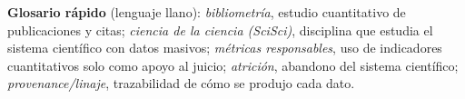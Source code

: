 \begin{tcolorbox}[nota]
\textbf{Glosario rápido} (lenguaje llano): \emph{bibliometría}, estudio
cuantitativo de publicaciones y citas; \emph{ciencia de la ciencia (SciSci)},
disciplina que estudia el sistema científico con datos masivos; \emph{métricas
responsables}, uso de indicadores cuantitativos solo como apoyo al juicio;
\emph{atrición}, abandono del sistema científico; \emph{provenance/linaje},
trazabilidad de cómo se produjo cada dato.
\end{tcolorbox}
